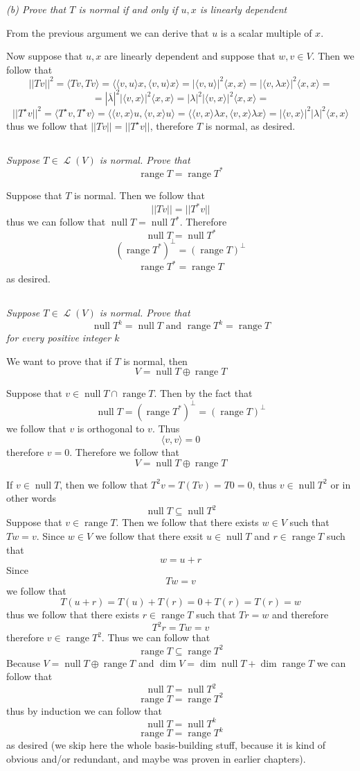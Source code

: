 \documentclass[11pt,oneside,titlepage]{book}
\DeclareMathOperator \map {\mathcal {L}}
\DeclareMathOperator \ns {null}
\DeclareMathOperator \range {range}
\newcommand{\eangle}[1]{\langle #1 \rangle}
\begin{document}
\textit{(b) Prove that $T$ is normal if and only if $u, x$ is linearly dependent}

From the previous argument we can derive that $u$ is a scalar multiple of $x$.

Now suppose that $u, x$ are linearly dependent and suppose that $w, v \in V$. Then we follow that
$$||Tv||^2 = \eangle{Tv, Tv} = \eangle{\eangle{v, u} x , \eangle{v, u} x} =
|\eangle{v, u}|^2\eangle{x, x} = |\eangle{v, \lambda x}|^2 \eangle{x, x} = $$
$$ = 
|\overline{\lambda}|^2| \eangle{v,  x}|^2 \eangle{x, x} =|\lambda|^2| \eangle{v,  x}|^2 \eangle{x, x} =
$$
$$||T^\star v||^2 = \eangle{T^\star v, T^\star v} = \eangle{\eangle{v, x} u , \eangle{v, x} u} =
\eangle{\eangle{v, x} \lambda x , \eangle{v, x} \lambda x} = |\eangle{v, x}|^2|\lambda|^2 \eangle{x, x}
$$
thus we follow that $||Tv|| = ||T^\star v||$, therefore $T$ is normal, as desired.

\subsection{}

\textit{Suppose $T \in \map(V)$ is normal. Prove that 
  $$\range T = \range T^*$$
}


Suppose that $T$ is normal. Then we follow that
$$||Tv|| = ||T^* v||$$
thus we can follow that $\ns T = \ns T^*$. Therefore
$$\ns T = \ns T^*$$
$$(\range T^*)^\perp = (\range T)^\perp$$
$$\range T^* = \range T$$
as desired.

\subsection{}

\textit{Suppose $T \in \map(V)$ is normal. Prove that 
  $$\ns T^k = \ns T \text{ and } \range T^k = \range T$$
  for every positive integer $k$}

We want to prove that if $T$ is normal, then
$$V = \ns T \oplus \range T$$

Suppose that $v \in \ns T \cap \range T$. Then by the fact that
$$\ns T = (\range T^*)^\perp = (\range T)^\perp$$
we follow that $v$ is orthogonal to $v$. Thus
$$\eangle {v, v} = 0$$
therefore $v = 0$. Therefore we follow that
$$V = \ns T \oplus \range T$$

If $v \in \ns T$, then we follow that $T^2v = T(Tv) = T0 = 0$, thus $v \in \ns T^2$ or in other
words
$$\ns T \subseteq \ns T^2$$
Suppose that $v \in \range T$. Then we follow that there exists $w \in V$ such that $Tw = v$.
Since $w \in V$ we follow that there exsit $u \in \ns T$ and $r \in \range T$ such that
$$w = u + r$$
Since
$$Tw = v$$
we follow that
$$T(u + r) = T(u) + T(r) = 0 + T(r) = T(r) = w$$
thus we follow that there exists $r \in \range T$ such that $Tr = w$ and therefore
$$T^2 r = Tw = v$$
therefore $v \in \range T^2$. Thus we can follow that
$$\range T \subseteq \range T^2$$
Because $V = \ns T \oplus \range T$ and $\dim V = \dim \ns T + \dim \range T$ we can follow that
$$\ns T = \ns T^2$$
$$\range T = \range T^2$$
thus by induction we can follow that
$$\ns T = \ns T^k$$
$$\range T = \range T^k$$
as desired
(we skip here the whole basis-building stuff, because it is kind of obvious and/or redundant,
and maybe was proven in earlier chapters).
\end{document}
